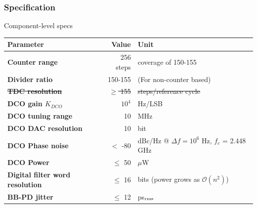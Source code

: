 \documentclass[t, screen, aspectratio=43]{beamer}
\begin{document}
\begin{frame}
	\frametitle{Specification\color{black}}
	\begin{block}{Component-level specs}
		\scriptsize
	\begin{table}[h!]
		\centering
		\tiny
		\def\arraystretch{1.5}		
		\setlength\arrayrulewidth{0.75pt}
		\setlength{\tabcolsep}{1em} %
		\begin{tabular}{|l|r|l|}
			\hline 
			\rule[-1ex]{0pt}{2.5ex} \cellcolor{gray!40}\textbf{Parameter} & \cellcolor{gray!40}\textbf{Value} & \cellcolor{gray!40}\textbf{Unit }\\ 
			\hline 
			\rule[-1ex]{0pt}{2.5ex} \textbf{Counter range}  & 256 steps & coverage of 150-155 \\ 
			\hline 
			\rule[-1ex]{0pt}{2.5ex} \textbf{Divider ratio} & 150-155  & (For non-counter based)\\ 
			\hline 
			\rule[-1ex]{0pt}{2.5ex} {\color{red}\st{\textbf{TDC resolution}}} &{\color{red}\st{$\geq$ 155}}  & {\color{red}\st{steps/reference cycle}}\\ 
			\hline 
			\rule[-1ex]{0pt}{2.5ex} \textbf{DCO gain $K_{DCO}$} & $10^4$ & Hz/LSB \\ 
			\hline 
			\rule[-1ex]{0pt}{2.5ex} \textbf{DCO tuning range} & 10 & MHz \\ 
			\hline 
			\rule[-1ex]{0pt}{2.5ex} \textbf{DCO DAC resolution} & 10 & bit \\ 
			\hline 
			\rule[-1ex]{0pt}{2.5ex} \textbf{DCO Phase noise} &$<$ -80 & dBc/Hz @ $\Delta f=10^6$ Hz, $f_c$ = 2.448 GHz \\ 
			\hline 
			\rule[-1ex]{0pt}{2.5ex} \textbf{DCO Power} & $\leq$ 50 & $\mu$W \\ 
			\hline 
			\rule[-1ex]{0pt}{2.5ex} \textbf{Digital filter word resolution} & $\leq$ 16 & bits (power grows as $\mathcal{O}(n^2)$) \\ 
			\hline 
			\rule[-1ex]{0pt}{2.5ex} \textbf{BB-PD jitter} & $\leq$ 12 & ps$_{\textnormal{rms}}$ \\ 
			\hline 
		\end{tabular} 
		\label{design_specs}
	\end{table}   
	\end{block}    
\end{frame}

\end{document}
